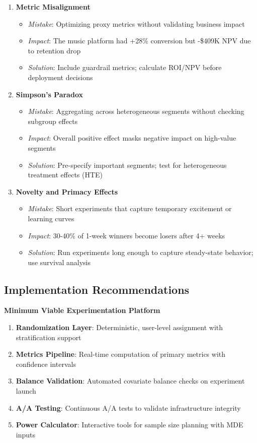 \begin{enumerate}
    \item \textbf{Metric Misalignment}
    \begin{itemize}
        \item \textit{Mistake}: Optimizing proxy metrics without validating business impact
        \item \textit{Impact}: The music platform had +28\% conversion but -\$409K NPV due to retention drop
        \item \textit{Solution}: Include guardrail metrics; calculate ROI/NPV before deployment decisions
    \end{itemize}

    \item \textbf{Simpson's Paradox}
    \begin{itemize}
        \item \textit{Mistake}: Aggregating across heterogeneous segments without checking subgroup effects
        \item \textit{Impact}: Overall positive effect masks negative impact on high-value segments
        \item \textit{Solution}: Pre-specify important segments; test for heterogeneous treatment effects (HTE)
    \end{itemize}

    \item \textbf{Novelty and Primacy Effects}
    \begin{itemize}
        \item \textit{Mistake}: Short experiments that capture temporary excitement or learning curves
        \item \textit{Impact}: 30-40\% of 1-week winners become losers after 4+ weeks
        \item \textit{Solution}: Run experiments long enough to capture steady-state behavior; use survival analysis
    \end{itemize}
\end{enumerate}

\subsection{Implementation Recommendations}

\textbf{Minimum Viable Experimentation Platform}
\begin{enumerate}
    \item \textbf{Randomization Layer}: Deterministic, user-level assignment with stratification support
    \item \textbf{Metrics Pipeline}: Real-time computation of primary metrics with confidence intervals
    \item \textbf{Balance Validation}: Automated covariate balance checks on experiment launch
    \item \textbf{A/A Testing}: Continuous A/A tests to validate infrastructure integrity
    \item \textbf{Power Calculator}: Interactive tools for sample size planning with MDE inputs
\end{enumerate}

